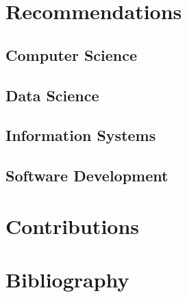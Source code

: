 \documentclass{article}
\begin{document}
\section{Recommendations}
	\subsection{Computer Science}
		
		\pagebreak
	\subsection{Data Science}
		
		\pagebreak
	\subsection{Information Systems}
		
		\pagebreak
	\subsection{Software Development}
		
		\pagebreak

\section{Contributions}
	\pagebreak

\section{Bibliography}
	\nocite{*}
	
	
\end{document}
